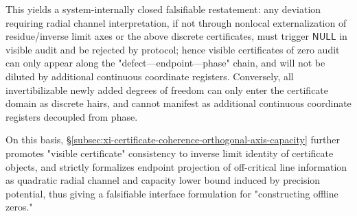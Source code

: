 This yields a system-internally closed falsifiable restatement: any deviation requiring radial channel interpretation, if not through nonlocal externalization of residue/inverse limit axes or the above discrete certificates, must trigger \(\mathsf{NULL}\) in visible audit and be rejected by protocol; hence visible certificates of zero audit can only appear along the "defect—endpoint—phase" chain, and will not be diluted by additional continuous coordinate registers. Conversely, all invertibilizable newly added degrees of freedom can only enter the certificate domain as discrete hairs, and cannot manifest as additional continuous coordinate registers decoupled from phase.

On this basis, \S\ref{subsec:xi-certificate-coherence-orthogonal-axis-capacity} further promotes "visible certificate" consistency to inverse limit identity of certificate objects, and strictly formalizes endpoint projection of off-critical line information as quadratic radial channel and capacity lower bound induced by precision potential, thus giving a falsifiable interface formulation for "constructing offline zeros."
\endinput
